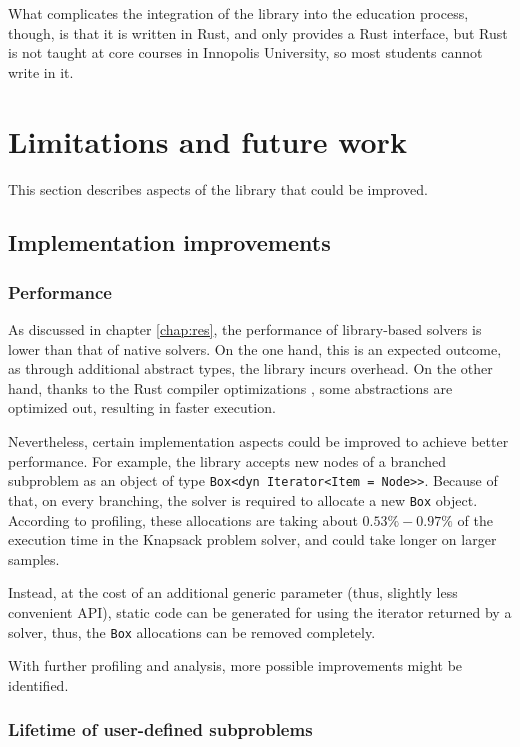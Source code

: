 What complicates the integration of the library into the education process, though, is that
it is written in Rust, and only provides a Rust interface, but Rust is not taught at
core courses in Innopolis University, so most students cannot write in it.

\section{Limitations and future work}

This section describes aspects of the library that could be improved.

\subsection{Implementation improvements}

\subsubsection{Performance}

As discussed in chapter \ref{chap:res}, the performance of library-based solvers is lower
than that of native solvers. On the one hand, this is an expected outcome, as through
additional abstract types, the library incurs overhead. On the other hand, thanks to the
Rust compiler optimizations \cite{klabnik2023rust},
some abstractions are optimized out, resulting in faster execution.

Nevertheless, certain implementation aspects could be improved to achieve better performance.
For example, the library accepts new nodes of a branched subproblem as an object of type
\texttt{Box<dyn Iterator<Item = Node>>}. Because of that, on every branching, the solver
is required to allocate a new \texttt{Box} object.
According to profiling, these allocations are taking about
$0.53\% - 0.97\%$ of the execution time in the Knapsack problem solver,
and could take longer on larger samples.

Instead, at the cost of an additional generic parameter (thus, slightly less convenient
API), static code can be generated for using the iterator returned by a solver, thus,
the \texttt{Box} allocations can be removed completely.

With further profiling and analysis, more possible improvements might be identified.

\subsubsection{Lifetime of user-defined subproblems}

